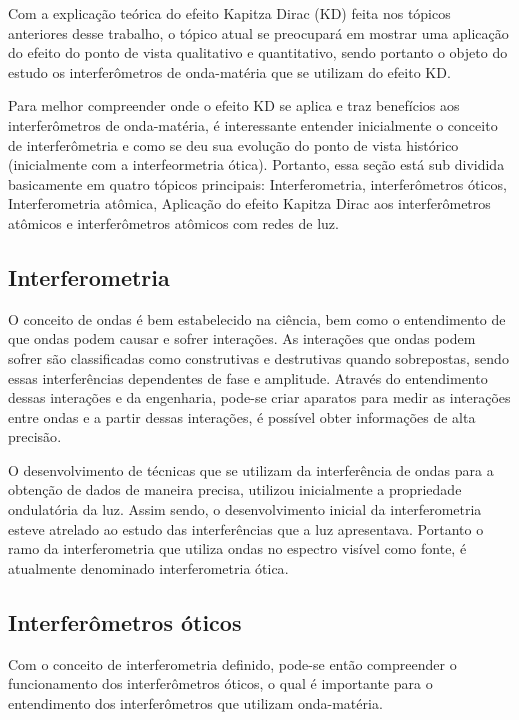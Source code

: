 \par Com a explicação teórica do efeito Kapitza Dirac (KD) feita nos tópicos anteriores desse trabalho, o tópico atual se preocupará em mostrar uma aplicação do efeito do ponto de vista qualitativo e quantitativo, sendo portanto o objeto do estudo os interferômetros de onda-matéria que se utilizam do efeito KD.

\par Para melhor compreender onde o efeito KD se aplica e traz benefícios aos interferômetros de onda-matéria, é interessante entender inicialmente o conceito de interferômetria e como se deu sua evolução do ponto de vista histórico (inicialmente com a interfeormetria ótica). Portanto, essa seção está sub dividida basicamente em quatro tópicos principais: Interferometria, interferômetros óticos, Interferometria atômica, Aplicação do efeito Kapitza Dirac aos interferômetros atômicos e interferômetros atômicos com redes de luz.

\subsection{Interferometria}

\par O conceito de ondas é bem estabelecido na ciência, bem como o entendimento de que ondas podem causar e sofrer interações. As interações que ondas podem sofrer são classificadas como construtivas e destrutivas quando sobrepostas, sendo essas interferências dependentes de fase e amplitude. Através do entendimento dessas interações e da engenharia, pode-se criar aparatos para medir as interações entre ondas e a partir dessas interações, é possível obter informações de alta precisão\cite{ricardo_1}.

\par O desenvolvimento de técnicas que se utilizam da interferência de ondas para a obtenção de dados de maneira precisa, utilizou inicialmente a propriedade ondulatória da luz. Assim sendo, o desenvolvimento inicial da interferometria esteve atrelado ao estudo das interferências que a luz apresentava. Portanto o ramo da interferometria que utiliza ondas no espectro visível como fonte, é atualmente denominado interferometria ótica\cite{ricardo_1}.

\subsection{Interferômetros óticos}

	\par Com o conceito de interferometria definido, pode-se então compreender o funcionamento dos interferômetros óticos, o qual é importante para o entendimento dos interferômetros que utilizam onda-matéria.

